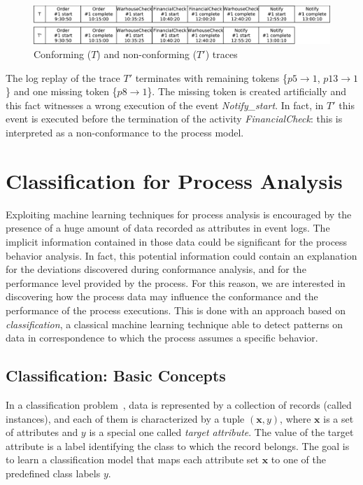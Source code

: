 \documentclass{llncs}
\begin{document}
\begin{figure}[h]
\centering
\includegraphics[width=345pt]
{./items/logConforme.pdf}
\caption{Conforming ($T$) and non-conforming ($T'$) traces}
\label{ConfLog}
\end{figure}

The log replay of the trace $T'$ terminates with remaining tokens \{$p5 \rightarrow 1$, $p13 \rightarrow 1$\} and one missing token \{${p8 \rightarrow 1}$\}. The missing token is created artificially and this fact witnesses a wrong execution of the event \emph{Notify\_start}. In fact, in $T'$ this event is executed before the termination of the activity \emph{FinancialCheck}: this is interpreted as a non-conformance to the process model. 

\section{Classification for Process Analysis}\label{ClassifApproach}
Exploiting machine learning techniques for process analysis is encouraged by the presence of a huge amount of data recorded as attributes in event logs. The implicit information contained in those data could be significant for the process behavior analysis. In fact, this potential information could contain an explanation for the deviations discovered during conformance analysis, and for the performance level provided by the process. For this reason, we are interested in discovering how the process data may influence the conformance and the performance of the process executions. This is done with an approach based on \emph{classification}, a classical machine learning technique able to detect patterns on data in correspondence to which the process assumes a specific behavior.

\subsection{Classification: Basic Concepts}\label{classifBasicConcept}

In a classification problem~\cite{tan2005introduction}, data is represented by a collection of records (called instances), and each of them is characterized by a tuple $(\mathbf{x},y)$, where $\mathbf{x}$ is a set of attributes and $y$ is a special one called \emph{target attribute}. The value of the target attribute is a label identifying   the class to which the record belongs. The goal is to learn a classification model that maps each attribute set $\mathbf{x}$ to one of the predefined class labels $y$.
\end{document}
